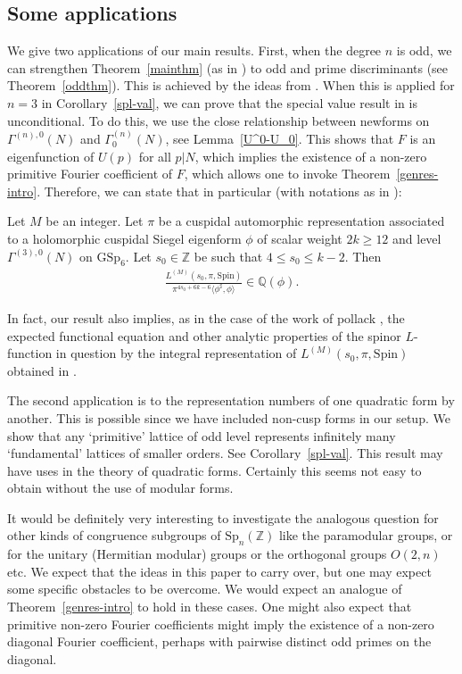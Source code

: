 \documentclass[11pt]{amsart}
\numberwithin{equation}{section}
\newcommand{\mbb}{\mathbb}
\newcommand{\mrm}{\mathrm} %
\newcommand{\lan}{\langle}
\newcommand{\ran}{\rangle}
\newcommand{\spnz}{\mrm{Sp}_n(\mbb Z)}
\begin{document}
\subsection{Some applications}
We give two applications of our main results. First, when the degree $n$ is odd, we can strengthen Theorem~\ref{mainthm} (as in \cite{boche-das}) to odd and prime discriminants (see Theorem~\ref{oddthm}). This is achieved by the ideas from \cite{boche-das}.
When this is applied for $n=3$ in Corollary~\ref{spl-val}, we can prove that the special value result in \cite{eischen2024algebraicity} is unconditional. To do this, we use the close relationship between newforms on $\Gamma^{(n),0}(N)$ and $\Gamma_0^{(n)}(N)$, see Lemma~\ref{U^0-U_0}. This shows that $F$ is an eigenfunction of $U(p)$ for all $p|N$, which implies the existence of a non-zero primitive Fourier coefficient of $F$, which allows one to invoke Theorem~\ref{genres-intro}. Therefore, we can state that in particular (with notations as in \cite{eischen2024algebraicity}):
\begin{theorem} \label{eis-thm}
   Let $M$ be an integer.
Let $\pi$ be a cuspidal automorphic representation associated to a holomorphic cuspidal Siegel
eigenform $\phi$ of scalar weight $2k\ge  12$ and level $\Gamma^{(3),0}(N)$ on $\mrm{GSp}_6$. Let $s_0\in\mbb Z$ be such that $4\le s_0\le k-2$. Then
\begin{align}
    \frac{L^{(M)}(s_0, \pi, \mrm{Spin})}{\pi^{4s_0+6k-6}\lan \phi^\sharp, \phi\ran}\in \mbb Q(\phi).
\end{align}
\end{theorem}
In fact, our result also implies, as in the case of the work of pollack \cite{pollack2017spin}, the expected functional equation and other analytic properties of the spinor $L$-function in question by the integral representation of $L^{(M)}(s_0, \pi, \mrm{Spin})$ obtained in \cite{eischen2024algebraicity}. 

The second application is to the representation numbers of one quadratic form by another. This is possible since we have included non-cusp forms in our setup. We show that any `primitive' lattice of odd level represents infinitely many `fundamental' lattices of smaller orders. See Corollary~\ref{spl-val}. This result may have uses in the theory of quadratic forms. Certainly this seems not easy to obtain without the use of modular forms.

It would be definitely very interesting to investigate the analogous question for other kinds of congruence subgroups of $\spnz$ like the paramodular groups, or for the unitary (Hermitian modular) groups or the orthogonal groups $O(2,n)$ etc. We expect that the ideas in this paper to carry over, but one may expect some specific obstacles to be overcome. We would expect an analogue of Theorem~\ref{genres-intro} to hold in these cases.
One might also expect that primitive non-zero Fourier coefficients might imply the existence of a non-zero diagonal Fourier coefficient, perhaps with pairwise distinct odd primes on the diagonal.
\end{document}
